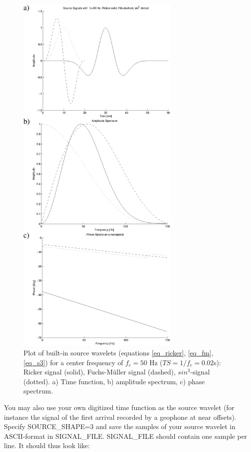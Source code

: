 \documentclass[11pt,onecolumn,oneside]{article}
\begin{document}
\begin{figure}
\begin{center}
\includegraphics[width=8cm,angle=0]{eps/signals.eps}
\end{center}
\caption{Plot of built-in source wavelets (equations \ref{eq_ricker}, \ref{eq_fm}, \ref{eq_s3}) for a center frequency of $f_c=50$ Hz 
($TS=1/f_c=0.02$s): Ricker signal (solid), Fuchs-M\"uller signal (dashed), $sin^3$-signal (dotted). a) Time function, b) amplitude
spectrum, c) phase spectrum.}
\label{fig_source_wavelets}
\end{figure}

You may also use your own digitized time function as the source wavelet (for instance the signal of the first arrival recorded by a geophone at near offsets). Specify SOURCE\_SHAPE=3 and save the samples of your source wavelet in ASCII-format in SIGNAL\_FILE. SIGNAL\_FILE should contain one sample per line. It should thus look like:
\end{document}
